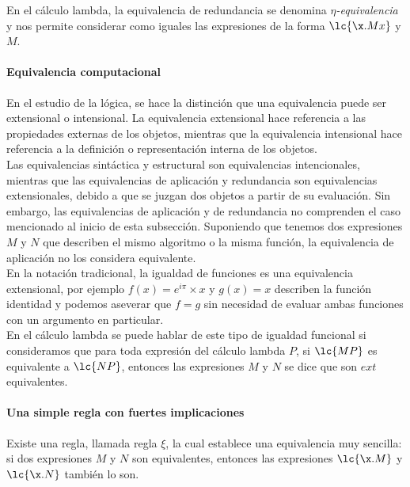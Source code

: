 En el cálculo lambda, la equivalencia de redundancia se denomina
\(\eta\)\emph{-equivalencia} y nos permite considerar como iguales las
expresiones de la forma \(\lc{\x.M x}\) y \(M\).\\

\paragraph{Equivalencia computacional}

En el estudio de la lógica, se hace la distinción que una equivalencia puede ser
extensional o intensional. La equivalencia extensional hace referencia a las
propiedades externas de los objetos, mientras que la equivalencia intensional
hace referencia a la definición o representación interna de los objetos.\\

Las equivalencias sintáctica y estructural son equivalencias intencionales,
mientras que las equivalencias de aplicación y redundancia son equivalencias
extensionales, debido a que se juzgan dos objetos a partir de su evaluación. Sin
embargo, las equivalencias de aplicación y de redundancia no comprenden el caso
mencionado al inicio de esta subsección. Suponiendo que tenemos dos expresiones
\(M\) y \(N\) que describen el mismo algoritmo o la misma función, la
equivalencia de aplicación no los considera equivalente.\\

En la notación tradicional, la igualdad de funciones es una equivalencia
extensional, por ejemplo \(f(x) = e^{i\pi}\times x\) y \(g(x) = x\) describen la
función identidad y podemos aseverar que \(f=g\) sin necesidad de evaluar ambas
funciones con un argumento en particular.\\

En el cálculo lambda se puede hablar de este tipo de igualdad funcional si
consideramos que para toda expresión del cálculo lambda \(P\), si \(\lc{M P}\)
es equivalente a \(\lc{N P}\), entonces las expresiones \(M\) y \(N\) se dice
que son \(ext\) equivalentes.\\

\paragraph{Una simple regla con fuertes implicaciones}

Existe una regla, llamada regla \(\xi\), la cual establece una equivalencia muy
sencilla: si dos expresiones \(M\) y \(N\) son equivalentes, entonces las
expresiones \(\lc{\x.M}\) y \(\lc{\x.N}\) también lo son.\\

